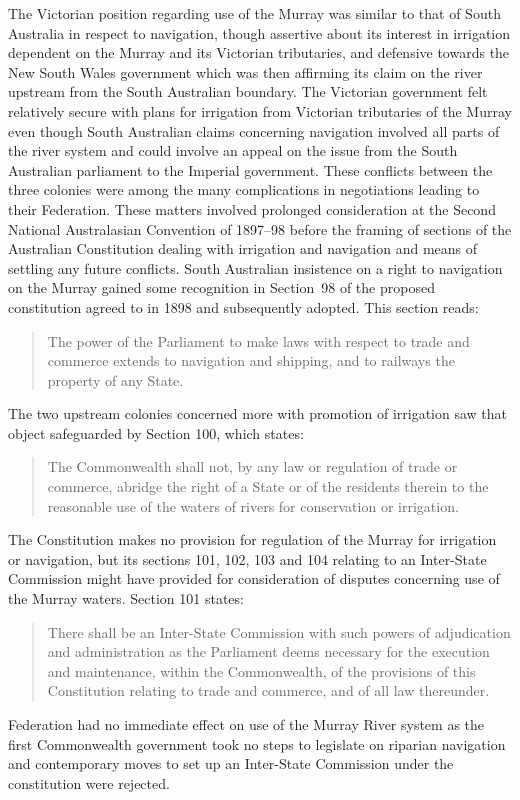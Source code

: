 The Victorian position regarding use of the Murray was similar to that
of South Australia in respect to navigation, though assertive about
its interest in irrigation dependent on the Murray and its Victorian
tributaries, and defensive towards the New South Wales government
which was then affirming its claim on the river upstream from the
South Australian boundary.  The Victorian government felt relatively
secure with plans for irrigation from Victorian tributaries of the
Murray even though South Australian claims concerning navigation
involved all parts of the river system and could involve an appeal on
the issue from the South Australian parliament to the Imperial
government.  These conflicts between the three colonies were among the
many complications in negotiations leading to their Federation.  These
matters involved prolonged consideration at the Second National
Australasian Convention of 1897--98 before the framing of sections of
the Australian Constitution  dealing
with irrigation and navigation and means of settling any future
conflicts.  South Australian insistence on a right to navigation
 on the Murray gained some recognition in Section~98
of the proposed constitution agreed to in 1898 and subsequently
adopted.  This section reads:
\begin{quote}
	The power of the Parliament to make laws with respect to trade
	and commerce extends to navigation and shipping, and to
	railways the property of any State.
\end{quote}

The two upstream colonies concerned more with promotion of irrigation
saw that object safeguarded by Section 100, which states:
\begin{quote}
	The Commonwealth shall not, by any law or regulation of trade
	or commerce, abridge the right of a State or of the residents
	therein to the reasonable use of the waters of rivers for
	conservation or irrigation.
\end{quote}

The Constitution makes no provision for regulation of the Murray for
irrigation or navigation, but its sections 101, 102, 103 and 104
relating to an Inter-State Commission might have provided for
consideration of disputes concerning use of the Murray waters.
Section 101 states:
\begin{quote}
	There shall be an Inter-State Commission with such powers of
	adjudication and administration as the Parliament deems
	necessary for the execution and maintenance, within the
	Commonwealth, of the provisions of this Constitution relating
	to trade and commerce, and of all law thereunder.
\end{quote}
Federation had no immediate effect on use of the Murray River system
as the first Commonwealth government took no steps to legislate on
riparian navigation and contemporary moves to set up an Inter-State
Commission under the constitution were
rejected.


